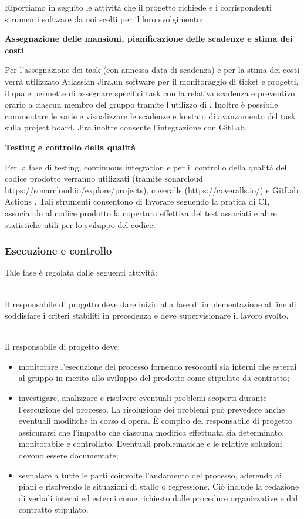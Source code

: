 Riportiamo in seguito le attività che il progetto richiede e i corrispondenti strumenti software da noi scelti per il loro svolgimento:

\textbf{Assegnazione delle mansioni, pianificazione delle scadenze e stima dei costi}

Per l'assegnazione dei task (con annessa data di scadenza) e per la stima dei costi verrà utilizzato  Atlassian Jira,un software per il monitoraggio di ticket e progetti, il quale permette di assegnare specifici task con la relativa scadenza e preventivo orario a ciascun membro del gruppo tramite l'utilizzo di . Inoltre è possibile commentare le varie  e visualizzare le scadenze e lo stato di avanzamento del task sulla project board. Jira inoltre consente l'integrazione con GitLab.

\textbf{Testing e controllo della qualità}

Per la fase di testing, continuous integration e per il controllo della qualità del codice prodotto verranno utilizzati  (tramite sonarcloud https://sonarcloud.io/explore/projects), coveralls (https://coveralls.io/) e GitLab Actions . Tali strumenti consentono di lavorare seguendo la pratica di CI, associando al codice prodotto la copertura effettiva dei test associati e altre  statistiche utili per lo sviluppo del codice.

\subsubsection{Esecuzione e controllo}
Tale fase è regolata dalle seguenti attività:

\leavevmode \\
Il responsabile di progetto deve dare inizio alla fase di implementazione al fine di soddisfare i criteri stabiliti in precedenza e deve supervisionare il lavoro svolto.

\leavevmode \\
Il responsabile di progetto deve:
\begin{itemize}
    \item monitorare l'esecuzione del processo fornendo resoconti sia interni che esterni al gruppo in merito allo sviluppo del prodotto come stipulato da contratto;
    \item investigare, analizzare e risolvere eventuali problemi scoperti durante l'esecuzione del processo. La risoluzione dei problemi può prevedere anche eventuali modifiche in corso d'opera. È compito del responsabile di progetto assicurarsi che l'impatto che ciascuna modifica effettuata sia determinato, monitorabile e controllato. Eventuali problematiche e le relative soluzioni devono essere documentate;
    \item segnalare a tutte le parti coinvolte l'andamento del processo, aderendo ai piani e risolvendo le situazioni di stallo o regressione. Ciò include la redazione di verbali interni ed esterni come richiesto dalle procedure organizzative e dal contratto stipulato.
\end{itemize}

